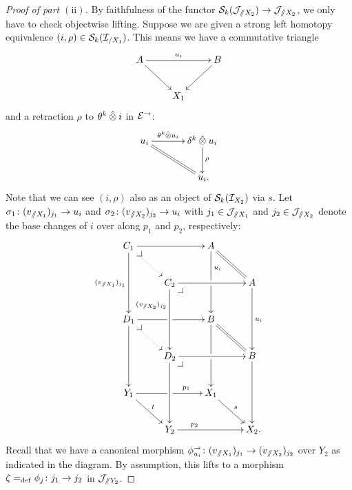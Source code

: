 \documentclass[reqno,10pt,a4paper,oneside,draft]{amsart}
\begin{document}
\begin{proof}[Proof of part $\mathrm{(ii)}$]
By faithfulness of the functor $\cal{S}_k(\cal{J}_{\fakeslice X_2} )\to \cal{J}_{\fakeslice X_2}$, we only have to check objectwise lifting.
Suppose we are given a strong left homotopy equivalence $(i, \rho) \in \cal{S}_k(\cal{I}_{/X_1})$.
This means we have a commutative triangle
\[
\xymatrix{
  A
  \ar[rr]^{u_i}
  \ar[dr]
&&
  B
  \ar[dl]
\\&
  X_1
}
\]
and a retraction $\rho$ to $\thetak \hatotimes i$ in $\catE^\to$:
\[
\xymatrix@C+1em{
  u_i
  \ar[r]^-{\thetak \hatotimes u_i}
  \ar@{=}[dr]
&
  \kcyl \hatotimes u_i \ar[d]^{\rho}
\\&
  u_i
\rlap{.}}
\]
Note that we can see $(i, \rho)$ also as an object of $\cal{S}_k(\cal{I}_{X_2})$ via $s$.
Let $\sigma_1 \co (v_{\fakeslice X_1})_{j_1} \to u_i$ and $\sigma_2 \co (v_{\fakeslice X_2})_{j_2} \to u_i$ with $j_1 \in \cal{J}_{\fakeslice X_1}$ and $j_2 \in \cal{J}_{\fakeslice X_2}$ denote the base changes of $i$ over along $p_1$ and $p_2$, respectively:
\[
\xymatrix{
  C_1
  \ar[rr]
  \ar[dd]_{(v_{\fakeslice X_1})_{j_1}}
  \pullback{dr}
  \ar@{.>}[dr]
&&
  A
  \ar[dd]^(0.3){u_i}|!{[dl];[dr]}{\hole}
  \ar@{=}[dr]
\\&
  C_2
  \ar[rr]
  \ar[dd]_(0.3){(v_{\fakeslice X_2})_{j_2}}
  \pullback{dr}
&&
  A
  \ar[dd]^{u_i}
\\
  D_1
  \ar[rr]|!{[dr];[ur]}{\hole}
  \ar[dd]
  \pullback{dr}
  \ar@{.>}[dr]
&&
  B
  \ar[dd]|!{[dl];[dr]}{\hole}
  \ar@{=}[dr]
\\&
  D_2
  \ar[rr]
  \ar[dd]
  \pullback{dr}
&&
  B
  \ar[dd]
\\
  Y_1
  \ar[rr]^(0.7){p_1}|!{[dr];[ur]}{\hole}
  \ar[dr]^{t}
&&
  X_1
  \ar[dr]^{s}
\\&
  Y_2
  \ar[rr]^(0.3){p_2}
&&
  X_2
\rlap{.}}
\]
Recall that we have a canonical morphism $\phi_{u_i}^\to \co (v_{\fakeslice X_1})_{j_1} \to (v_{\fakeslice X_2})_{j_2}$ over $Y_2$ as indicated in the diagram.
By assumption, this lifts to a morphism $\zeta \defeq \phi_j \co j_1 \to j_2$ in $\cal{J}_{\fakeslice Y_2}$.


\end{proof}
\end{document}

